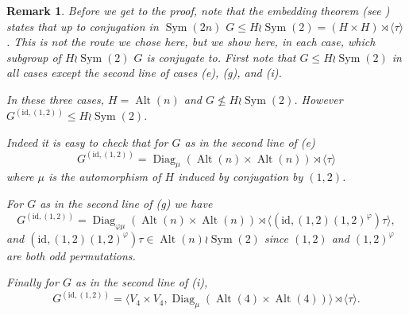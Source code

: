 \documentclass[11pt]{amsart}
\newtheorem{remark}[theorem]{Remark}
\DeclareMathOperator{\Sym}{Sym}
\DeclareMathOperator{\Alt}{Alt}
\DeclareMathOperator{\Diag}{Diag}
\begin{document}
                  




\begin{remark} Before we get to the proof, note that the embedding theorem (see \cite[Theorem 5.5]{PS}) states that  up to conjugation   in $\Sym(2n)$   $G \leqslant H \wr \Sym(2)=(H\times H)\rtimes\langle \tau\rangle$. This is not the route we chose here, but we show here, in each case, which subgroup of $H \wr \Sym(2)$ $G$ is conjugate to.
First note that $G\leqslant  H \wr \Sym(2)$ in all cases except the second line of cases (e), (g), and (i). 

In these three cases, $H=\Alt(n)$ and   $G\not\leqslant  H \wr \Sym(2)$.
However $G^{(\mathrm{id},(1,2))}\leqslant  H \wr \Sym(2)$.

Indeed it is easy to check that for $G$ as in the second line of (e) 
$$G^{(\mathrm{id},(1,2))}=\Diag_\mu(\Alt(n)\times \Alt(n))\rtimes \langle\tau\rangle$$
where $\mu$ is the automorphism of $H$ induced by conjugation by $(1,2)$.

For $G$ as in the second line of  (g) we have 
$$G^{(\mathrm{id},(1,2))}=\Diag_{\varphi\mu}(\Alt(n)\times \Alt(n))\rtimes \langle(\mathrm{id},(1,2)(1,2)^\varphi)\tau\rangle,$$
and $(\mathrm{id},(1,2)(1,2)^\varphi)\tau\in \Alt(n)\wr \Sym(2)$ since $(1,2)$ and $(1,2)^\varphi$ are both odd permutations.

Finally for $G$ as in the second line of (i), 
$$G^{(\mathrm{id},(1,2))}=\langle V_4\times V_4,\Diag_\mu(\Alt(4)\times \Alt(4))\rangle \rtimes \langle\tau\rangle.$$

     


\end{remark}
\end{document}
